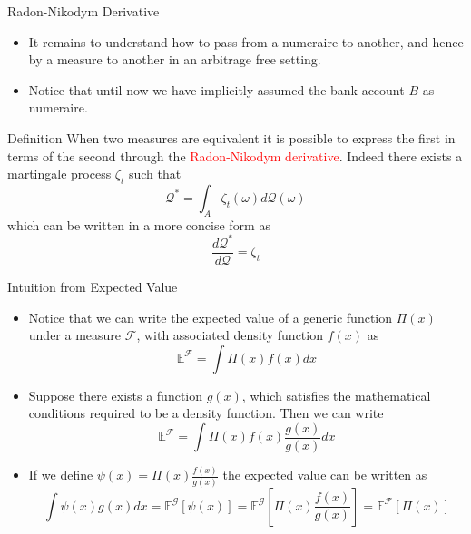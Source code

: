 \documentclass{beamer}
\begin{document}
\begin{frame}{Radon-Nikodym Derivative}
\begin{itemize}
	\item It remains to understand how to pass from a numeraire to another, and hence by a measure to another in an arbitrage free setting.
	\item Notice that until now we have implicitly assumed the bank account $B$ as numeraire.
	\end{itemize}
\begin{block}{Definition}
When two measures are equivalent it is possible to express the first in terms of the second through the \textcolor{red}{Radon-Nikodym derivative}. Indeed there exists a martingale process $\zeta_t$ such that
\begin{equation*}
	\mathcal{Q}^* =\int_{A} \zeta_t(\omega)d\mathcal{Q}(\omega)
\end{equation*}
which can be written in a more concise form as
\begin{equation}
	\frac{d\mathcal{Q}^*}{d\mathcal{Q}} = \zeta_t
	\label{eq:radon_nikodym_der}
\end{equation}
\end{block}
\end{frame}

\begin{frame}{Intuition from Expected Value}
	\begin{itemize}
		\item Notice that we can write the expected value of a generic function $\Pi(x)$ under a measure $\mathcal{F}$, with associated density function $f(x)$ as
		\begin{equation*}
			\mathbb{E}^\mathcal{F}=\int\Pi(x)f(x)dx
		\end{equation*}
		\item Suppose there exists a function $g(x)$, which satisfies the mathematical conditions required to be a density function. Then we can write
		\begin{equation*}
			\mathbb{E}^\mathcal{F}=\int\Pi(x)f(x)\frac{g(x)}{g(x)}dx
		\end{equation*}
		\item If we define $\psi(x)=\Pi(x)\frac{f(x)}{g(x)}$ the expected value can be written as 
		\begin{equation*}
			\int\psi(x)g(x)dx=\mathbb{E}^\mathcal{G}\left[\psi(x)\right]=\mathbb{E}^{\mathcal{G}}\left[\Pi(x)\frac{f(x)}{g(x)}\right]=\mathbb{E}^\mathcal{F}\left[\Pi(x)\right]
		\end{equation*}
	\end{itemize}
\end{frame}
\end{document}
